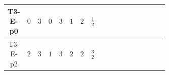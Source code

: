 \documentclass[8pt]{article}
\begin{document}
\begin{landscape}
\begin{longtable}{@{}cccccccc >{\raggedright\arraybackslash}p{0.21\linewidth} >{\raggedright\arraybackslash}p{0.21\linewidth} >{\raggedright\arraybackslash}p{0.21\linewidth}@{}}
\midrule
T3-E-p0 & $0$ & $3$ & $0$ & $3$ & $1$ & $2$ & $\frac{1}{2}$ &  & \scriptsize\adjustbox{max width=\linewidth}{$\begin{gathered} -\frac{2 \hbar  \log \left(\frac{\bar{\mu}^{2}}{M_F^2}\right) \overline{y_{2,i_1,r_1}} \overline{Y_{e,i_2,i_3}} H_{a_1} S_{2,j_1} y_{2,i_2,r_1} Y_{e,i_1,i_3} H_{a_1}{}^{\dagger } S_{2,j_1}{}^{\dagger }}{\sqrt{3}} \\ +2 i \sqrt{\frac{2}{3}} \hbar  \log \left(\frac{\bar{\mu}^{2}}{M_F^2}\right) \overline{y_{2,i_1,r_1}} \overline{Y_{e,i_2,i_3}} H_{a_2} S_{2,j_2} y_{2,i_2,r_1} Y_{e,i_1,i_3} H_{a_1}{}^{\dagger } S_{2,j_1}{}^{\dagger } \mathcal{I}_{H1,a_1,a_2,j_2,j_1}{}^1 \\ -\frac{2 \hbar  \log \left(\frac{\bar{\mu}^{2}}{M_F^2}\right) \overline{y_{2,i_1,r_1}} H_{a_2} S_{2,j_2} y_{2,i_1,r_1} H_{a_1}{}^{\dagger } S_{2,j_1}{}^{\dagger } \mathcal{I}_{H2,a_1,a_2,j_1,j_2}{}^2 \lambda_{HS_2}^{(1)}^{(2)}}{\sqrt{3}}\end{gathered}$} &  \\
\midrule
T3-E-p2 & $2$ & $3$ & $1$ & $3$ & $2$ & $2$ & $\frac{3}{2}$ &  & \scriptsize\adjustbox{max width=\linewidth}{$\begin{gathered} -\frac{2 \hbar  \log \left(\frac{\bar{\mu}^{2}}{M_F^2}\right) \overline{y_{2,i_1,r_1}} \overline{Y_{e,i_2,i_3}} H_{a_1} S_{2,j_1} y_{2,i_2,r_1} Y_{e,i_1,i_3} H_{a_1}{}^{\dagger } S_{2,j_1}{}^{\dagger }}{\sqrt{3}} \\ +2 i \sqrt{\frac{2}{3}} \hbar  \log \left(\frac{\bar{\mu}^{2}}{M_F^2}\right) \overline{y_{2,i_1,r_1}} \overline{Y_{e,i_2,i_3}} H_{a_2} S_{2,j_2} y_{2,i_2,r_1} Y_{e,i_1,i_3} H_{a_1}{}^{\dagger } S_{2,j_1}{}^{\dagger } \mathcal{I}_{H1,a_1,a_2,j_2,j_1}{}^1 \\ -\frac{2 \hbar  \log \left(\frac{\bar{\mu}^{2}}{M_F^2}\right) \overline{y_{2,i_1,r_1}} H_{a_2} S_{2,j_2} y_{2,i_1,r_1} H_{a_1}{}^{\dagger } S_{2,j_1}{}^{\dagger } \mathcal{I}_{H2,a_1,a_2,j_1,j_2}{}^2 \lambda_{HS_2}^{(1)}^{(2)}}{\sqrt{3}}\end{gathered}$} &  \\
\midrule
\bottomrule
\end{longtable}
\clearpage

\end{landscape}
\end{document}
